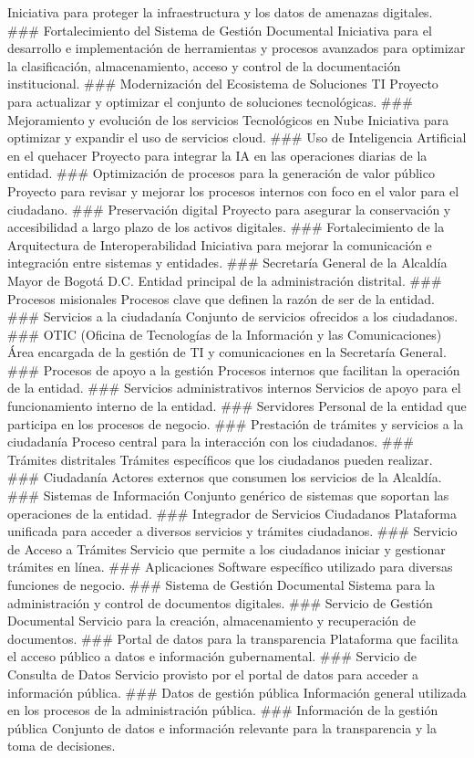 \documentclass[
	a4paper, %
	12pt, %
]{include/CSSullivanBusinessReport}
\begin{document}
Iniciativa para proteger la infraestructura y los datos de amenazas
digitales. \#\#\# Fortalecimiento del Sistema de Gestión Documental
Iniciativa para el desarrollo e implementación de herramientas y
procesos avanzados para optimizar la clasificación, almacenamiento,
acceso y control de la documentación institucional. \#\#\# Modernización
del Ecosistema de Soluciones TI Proyecto para actualizar y optimizar el
conjunto de soluciones tecnológicas. \#\#\# Mejoramiento y evolución de
los servicios Tecnológicos en Nube Iniciativa para optimizar y expandir
el uso de servicios cloud. \#\#\# Uso de Inteligencia Artificial en el
quehacer Proyecto para integrar la IA en las operaciones diarias de la
entidad. \#\#\# Optimización de procesos para la generación de valor
público Proyecto para revisar y mejorar los procesos internos con foco
en el valor para el ciudadano. \#\#\# Preservación digital Proyecto para
asegurar la conservación y accesibilidad a largo plazo de los activos
digitales. \#\#\# Fortalecimiento de la Arquitectura de
Interoperabilidad Iniciativa para mejorar la comunicación e integración
entre sistemas y entidades. \#\#\# Secretaría General de la Alcaldía
Mayor de Bogotá D.C. Entidad principal de la administración distrital.
\#\#\# Procesos misionales Procesos clave que definen la razón de ser de
la entidad. \#\#\# Servicios a la ciudadanía Conjunto de servicios
ofrecidos a los ciudadanos. \#\#\# OTIC (Oficina de Tecnologías de la
Información y las Comunicaciones) Área encargada de la gestión de TI y
comunicaciones en la Secretaría General. \#\#\# Procesos de apoyo a la
gestión Procesos internos que facilitan la operación de la entidad.
\#\#\# Servicios administrativos internos Servicios de apoyo para el
funcionamiento interno de la entidad. \#\#\# Servidores Personal de la
entidad que participa en los procesos de negocio. \#\#\# Prestación de
trámites y servicios a la ciudadanía Proceso central para la interacción
con los ciudadanos. \#\#\# Trámites distritales Trámites específicos que
los ciudadanos pueden realizar. \#\#\# Ciudadanía Actores externos que
consumen los servicios de la Alcaldía. \#\#\# Sistemas de Información
Conjunto genérico de sistemas que soportan las operaciones de la
entidad. \#\#\# Integrador de Servicios Ciudadanos Plataforma unificada
para acceder a diversos servicios y trámites ciudadanos. \#\#\# Servicio
de Acceso a Trámites Servicio que permite a los ciudadanos iniciar y
gestionar trámites en línea. \#\#\# Aplicaciones Software específico
utilizado para diversas funciones de negocio. \#\#\# Sistema de Gestión
Documental Sistema para la administración y control de documentos
digitales. \#\#\# Servicio de Gestión Documental Servicio para la
creación, almacenamiento y recuperación de documentos. \#\#\# Portal de
datos para la transparencia Plataforma que facilita el acceso público a
datos e información gubernamental. \#\#\# Servicio de Consulta de Datos
Servicio provisto por el portal de datos para acceder a información
pública. \#\#\# Datos de gestión pública Información general utilizada
en los procesos de la administración pública. \#\#\# Información de la
gestión pública Conjunto de datos e información relevante para la
transparencia y la toma de decisiones.
\end{document}
